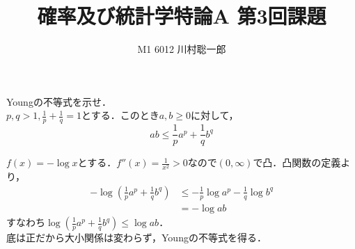 \documentclass[dvipdfmx]{jsreport}
\title{確率及び統計学特論A 第3回課題}
\author{M1 6012 川村聡一郎}
\date{}
\begin{document}
\maketitle

\begin{tcolorbox}
	Youngの不等式を示せ．\\
	$p, q> 1, \frac{1}{p}+ \frac{1}{q}= 1$とする．このとき$a, b\ge 0$に対して，
\begin{equation*}
	ab\le \frac{1}{p}a^p+ \frac{1}{q}b^q
\end{equation*}
\end{tcolorbox}

\begin{souanswer} %
	$f(x)= -\log{x}$とする．$f''(x)= \frac{1}{x^2}> 0$なので$(0, \infty)$で凸．凸関数の定義より，
\begin{align*}
	-\log{\left(\frac{1}{p}a^p+ \frac{1}{q}b^q\right)}
	&\le -\frac{1}{p}\log{a^p}- \frac{1}{q}\log{b^q}\\
	&= -\log{ab}
\end{align*}
	すなわち$\log{\left(\frac{1}{p}a^p+ \frac{1}{q}b^q\right)}\le \log{ab}$．\\
	底は正だから大小関係は変わらず，Youngの不等式を得る．
\end{souanswer}
\end{document}
